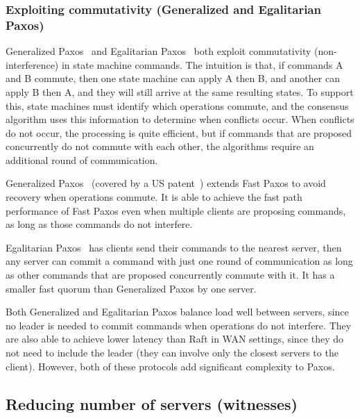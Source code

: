 \subsubsection{Exploiting commutativity (Generalized and Egalitarian Paxos)}

Generalized Paxos~\cite{Lamport:2005} and Egalitarian
Paxos~\cite{Moraru:2013} both exploit commutativity
(non-interference) in state
machine commands. The intuition is that, if commands A and B commute,
then one state machine can apply A then B, and another can apply B then
A, and they will still arrive at the same resulting states.
To support this, state machines must identify
which operations commute, and the consensus algorithm uses this
information to determine when conflicts occur.
When conflicts do not occur, the processing is quite efficient, but if
commands that are proposed concurrently do not commute with each other,
the algorithms require an additional round of communication.

Generalized Paxos~\cite{Lamport:2005} (covered by a US
patent~\cite{Lamport:2007}) extends Fast Paxos to avoid recovery when
operations commute. It is able to achieve the fast path performance of
Fast Paxos even when multiple clients are proposing commands, as long as
those commands do not interfere.

Egalitarian Paxos~\cite{Moraru:2013}
has clients send their commands to the nearest server, 
then any server can commit
a command with just one round of communication as long as other commands
that are proposed concurrently commute with it.
It has a smaller fast quorum than Generalized Paxos by one server.

Both Generalized and Egalitarian Paxos balance load well between
servers, since no leader is needed to commit commands when
operations do not interfere. They are also able to achieve lower latency
than Raft in WAN settings, since they do not need to include the leader
(they can involve only the closest servers to the client). However, both
of these protocols add significant complexity to Paxos.

\subsection{Reducing number of servers (witnesses)}

